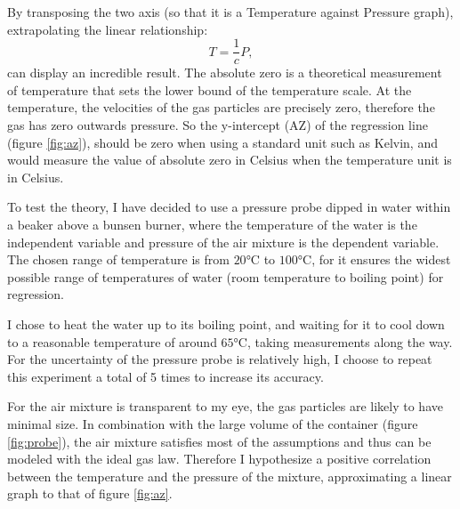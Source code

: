 \documentclass[a4paper,12pt]{article}
\begin{document}
By transposing the two axis (so that it is a Temperature against Pressure graph), extrapolating the linear relationship:
\[
    T = \frac{1}{c}P,
\]
can display an incredible result. The absolute zero is a theoretical measurement of temperature that sets the lower bound of the temperature scale. At the temperature, the velocities of the gas particles are precisely zero, therefore the gas has zero outwards pressure. So the y-intercept (AZ) of the regression line (figure \ref{fig:az}), should be zero when using a standard unit such as Kelvin, and would measure the value of absolute zero in Celsius when the temperature unit is in Celsius.




To test the theory, I have decided to use a pressure probe dipped in water within a beaker above a bunsen burner, where the temperature of the water is the independent variable and pressure of the air mixture is the dependent variable. The chosen range of temperature is from $20\si{\celsius}$ to $100\si{\celsius}$, for it ensures the widest possible range of temperatures of water (room temperature to boiling point) for regression.

I chose to heat the water up to its boiling point, and waiting for it to cool down to a reasonable temperature of around $65\si{\celsius}$, taking measurements along the way. For the uncertainty of the pressure probe is relatively high, I choose to repeat this experiment a total of 5 times to increase its accuracy.

For the air mixture is transparent to my eye, the gas particles are likely to have minimal size. In combination with the large volume of the container (figure \ref{fig:probe}), the air mixture satisfies most of the assumptions and thus can be modeled with the ideal gas law. Therefore I hypothesize a positive correlation between the temperature and the pressure of the mixture, approximating a linear graph to that of figure \ref{fig:az}.
\end{document}
